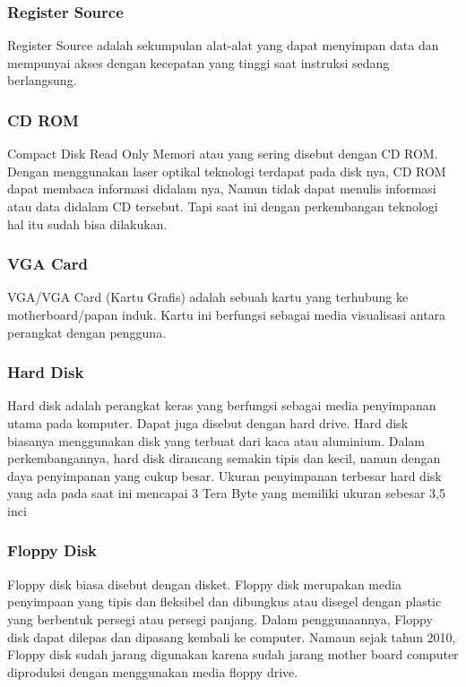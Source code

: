  			\subsubsection{Register Source}
 		Register Source adalah sekumpulan alat-alat yang dapat menyimpan data dan mempunyai akses dengan kecepatan yang tinggi saat instruksi sedang berlangsung.


 			\subsubsection{CD ROM}
 		Compact Disk Read Only Memori atau yang sering disebut dengan CD ROM. Dengan menggunakan laser optikal teknologi terdapat pada disk nya, CD ROM dapat membaca informasi didalam nya, Namun
 		tidak dapat menulis informasi atau data didalam CD tersebut. Tapi saat ini dengan perkembangan teknologi hal itu sudah bisa dilakukan.
 			\subsubsection{VGA Card}
 		VGA/VGA Card (Kartu Grafis) adalah sebuah kartu yang terhubung ke motherboard/papan induk. Kartu ini berfungsi sebagai media visualisasi antara perangkat dengan pengguna.


 			\subsubsection{Hard Disk}
 		Hard disk adalah perangkat keras yang berfungsi sebagai media penyimpanan utama pada komputer. Dapat juga disebut dengan hard drive. Hard disk biasanya menggunakan disk yang  terbuat dari kaca atau aluminium. Dalam perkembangannya, hard disk dirancang semakin tipis dan kecil, namun dengan daya penyimpanan yang cukup besar. Ukuran penyimpanan terbesar hard disk yang ada pada saat ini mencapai 3 Tera Byte yang memiliki ukuran sebesar 3,5 inci
 			\subsubsection{Floppy Disk}
 		Floppy disk biasa disebut dengan disket. Floppy disk merupakan media penyimpaan yang tipis dan fleksibel dan dibungkus atau disegel dengan plastic yang berbentuk persegi atau persegi panjang. Dalam penggunaannya, Floppy disk dapat dilepas dan dipasang kembali ke computer. Namaun sejak tahun 2010, Floppy disk sudah jarang digunakan karena sudah jarang mother board computer diproduksi dengan menggunakan media floppy drive.



